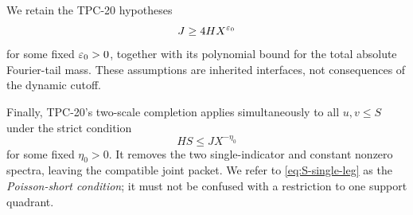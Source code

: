 We retain the TPC-20 hypotheses
\begin{equation}
 J\ge4HX^{\varepsilon_0}
 \label{eq:no-wrap}
\end{equation}
for some fixed \(\varepsilon_0>0\), together with its polynomial bound for the
total absolute Fourier-tail mass.  These assumptions are inherited
interfaces, not consequences of the dynamic cutoff.

Finally, TPC-20's two-scale completion applies simultaneously to all
\(u,v\le S\) under the strict condition
\begin{equation}
 HS\le JX^{-\eta_0}
 \label{eq:S-single-leg}
\end{equation}
for some fixed \(\eta_0>0\).  It removes the two single-indicator and
constant nonzero spectra, leaving the compatible joint packet.  We
refer to \eqref{eq:S-single-leg} as the \emph{Poisson-short condition};
it must not be confused with a restriction to one support quadrant.
